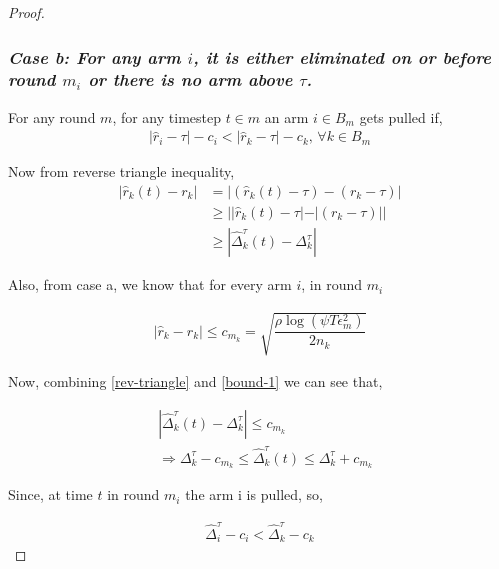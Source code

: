 \begin{proof}
\subsubsection{\textit{Case b: For any arm $i$, it is either eliminated on or before round $m_{i}$ or there is no arm above $\tau$.}}


	For any round $m$, for any timestep $t\in m$ an arm $i\in B_{m}$ gets pulled if,
\begin{align*}
|\hat{r}_{i} - \tau| - c_{i} < |\hat{r}_{k} - \tau| - c_{k} \text{, } \forall k\in B_{m}
\end{align*}

Now from reverse triangle inequality,
\begin{align}
|\hat{r}_{k}(t) - r_{k}|&=|(\hat{r}_{k}(t)-\tau) - (r_{k}-\tau)|\\
&\geq ||\hat{r}_{k}(t)-\tau|-|(r_{k}-\tau)||\\
&\geq |\hat{\Delta}_{k}^{\tau}(t) - \Delta_{k}^{\tau}| \label{rev-triangle}
\end{align}

Also, from case a, we know that for every arm $i$, in round $m_{i}$

\begin{align}
|\hat{r}_{k} - r_{k}| \leq c_{m_{k}} =  \sqrt{\dfrac{\rho\log{(\psi T\epsilon_{m}^{2})}}{2 n_{k}}}  \label{bound-1}
\end{align}

Now, combining \ref{rev-triangle} and \ref{bound-1} we can see that,

\begin{align*}
&|\hat{\Delta}_{k}^{\tau}(t) - \Delta_{k}^{\tau}| \leq c_{m_{k}}\\
&\Rightarrow \Delta_{k}^{\tau} - c_{m_{k}} \leq \hat{\Delta}_{k}^{\tau}(t) \leq \Delta_{k}^{\tau} +c_{m_{k}}
\end{align*}

Since, at time $t$ in round $m_{i}$ the arm i is pulled, so,

\begin{align*}
\hat{\Delta}_{i}^{\tau} - c_{i} < \hat{\Delta}_{k}^{\tau} - c_{k}
\end{align*}

\end{proof}